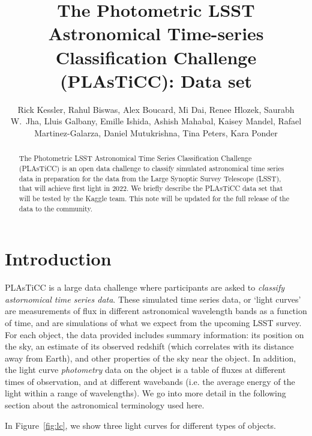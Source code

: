 \documentclass[\docopts]{\docclass}
\author{Rick Kessler,  Rahul Biswas, Alex Boucard, Mi Dai, Renee Hlozek,
Saurabh W.~Jha, Lluis Galbany, Emille Ishida, Ashish Mahabal, Kaisey Mandel, Rafael Martinez-Galarza, Daniel Mutukrishna, Tina Peters, Kara Ponder}
\begin{document}
\title{The Photometric LSST Astronomical Time-series Classification Challenge (PLAsTiCC): Data set}


\begin{abstract}
The Photometric LSST Astronomical Time Series Classification Challenge (PLAsTiCC) is an open data challenge to classify simulated astronomical time series data in preparation for the data from the Large Synoptic Survey Telescope (LSST), that will achieve first light in 2022. We briefly describe the PLAsTiCC data set that will be tested by the Kaggle team. This note will be updated for the full release of the data to the community.

\end{abstract}

\dockeys{}

\maketitlepost


\section{Introduction}
\label{sec:intro}
PLAsTiCC is a large data challenge where participants are asked to \textit{classify astornomical time series data}. These simulated time series data, or `light curves' are measurements of flux in different astronomical wavelength bands as a function of time, and are simulations of what we expect from the upcoming LSST survey. For each object, the data provided includes summary information: its position on the sky, an estimate of its observed redshift (which correlates with its distance away from Earth), and other properties of the sky near the object. In addition, the light curve \textit{photometry} data on the object is a table of fluxes at different times of observation, and at different wavebands (i.e. the average energy of the light within a range of wavelengths). We go into more detail in the following section about the astronomical terminology used here.

In Figure~\ref{fig:lc}, we show three light curves for different types of objects.
\end{document}
